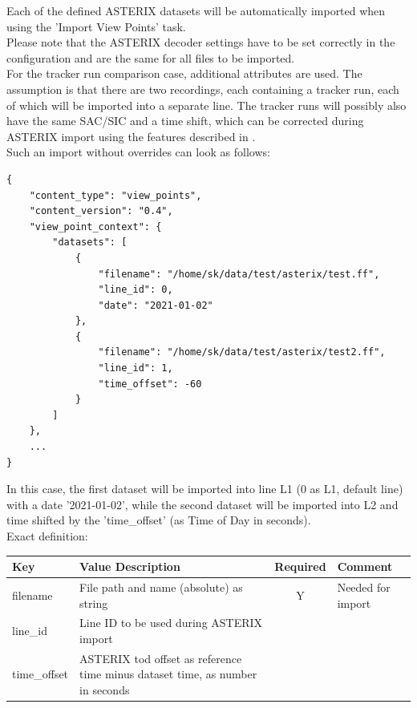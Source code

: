 Each of the defined ASTERIX datasets will be automatically imported when using the 'Import View Points' task. \\

Please note that the ASTERIX decoder settings have to be set correctly in the configuration and are the same for all files to be imported. \\

For the tracker run comparison case, additional attributes are used. The assumption is that there are two recordings, each containing a tracker run, each of which will be imported into a separate line. 
The tracker runs will possibly also have the same SAC/SIC and a time shift, which can be corrected during ASTERIX import using the features described in . \\

Such an import without overrides can look as follows:

\begin{lstlisting}[basicstyle=\small\ttfamily]
{
    "content_type": "view_points",
    "content_version": "0.4",
    "view_point_context": {
        "datasets": [
            {
                "filename": "/home/sk/data/test/asterix/test.ff",
                "line_id": 0,
                "date": "2021-01-02"
            },
            {
                "filename": "/home/sk/data/test/asterix/test2.ff",
                "line_id": 1,
                "time_offset": -60
            }
        ]
    },
    ...
}
\end{lstlisting}

In this case, the first dataset will be imported into line L1 (0 as L1, default line) with a date '2021-01-02', 
while the second dataset will be imported into L2 and time shifted by the 'time\_offset' (as Time of Day in seconds). \\

Exact definition:

\begin{center}
 \begin{table}[H]
  \begin{tabularx}{\textwidth}{ | l | X | c | X | }
    \hline
    \textbf{Key} & \textbf{Value Description} & \textbf{Required} & \textbf{Comment} \\ \hline
    filename & File path and name (absolute) as string & Y & Needed for import \\ \hline
    line\_id & Line ID to be used during ASTERIX import & & \\ \hline
    time\_offset & ASTERIX tod offset as reference time minus dataset time, as number in seconds & & \\ \hline
\end{tabularx}
\end{table}
\end{center}

